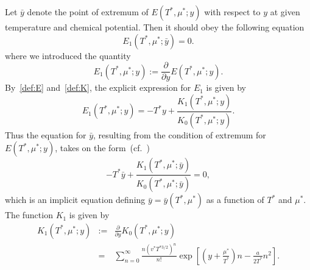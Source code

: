 \documentclass[12pt]{article}
\numberwithin{equation}{section}
\begin{document}
	Let $\bar{y}$ denote the point of extremum of $E(T^*,\mu^*;y)$ with respect to $y$ at given temperature and chemical potential. Then it should obey the following equation
	\begin{equation}
		\label{cond:extr}
		E_1(T^*,\mu^*;\bar{y}) = 0.
	\end{equation}
	where we introduced the quantity
	\begin{equation}
		\label{def:E1}
		E_1(T^*,\mu^*;y) := \frac{\partial}{\partial y} E(T^*,\mu^*;y).
	\end{equation}
	By~\eqref{def:E} and~\eqref{def:K}, the explicit expression for $E_1$ is given by
	\begin{equation}
		\label{def:reducedE1}
		E_1(T^*,\mu^*;y) = -T^* y + \frac{K_1(T^*,\mu^*;y)}{K_0(T^*,\mu^*;y)}.
	\end{equation}
	Thus the equation for $\bar{y}$, resulting from the condition of extremum for $E(T^*,\mu^*;y)$, takes on the form~(cf.~\cite[(2.19)]{KKD20})
	\begin{equation}
		\label{eq:bar_y}
		-T^* \bar{y} + \frac{K_1(T^*,\mu^*;\bar{y})}{K_0(T^*,\mu^*;\bar{y})} = 0,
	\end{equation}
	which is an implicit equation defining $\bar{y} = \bar{y}(T^*,\mu^*)$ as a function of $T^*$ and $\mu^*$.
	The function $K_1$ is given by
	\begin{eqnarray}
		K_1(T^*,\mu^*;y) & := & \frac{\partial}{\partial y} K_0(T^*,\mu^*;y)
		\nonumber\\
		& = & \sum_{n=0}^{\infty} \frac{n (v^* T^{*3/2})^n}{n!} \exp[\left(y+\frac{\mu^*}{T^*}\right)n - \frac{a}{2T^*}n^2].
	\end{eqnarray}
	
\end{document}
